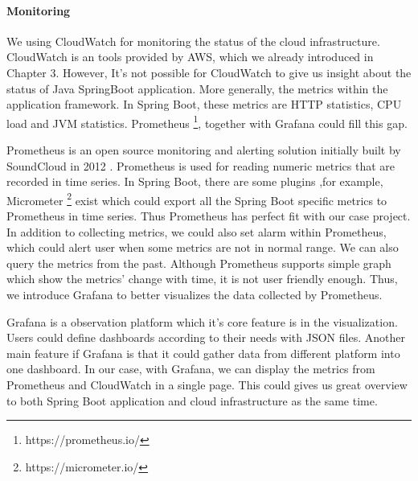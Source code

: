 \paragraph[]{Monitoring}
We using CloudWatch for monitoring the status of the cloud infrastructure. CloudWatch is an tools provided by AWS, which we already introduced in Chapter 3. However, It's not possible for CloudWatch to give us insight about the status of Java SpringBoot application. More generally, the metrics within the application framework. In Spring Boot, these metrics are HTTP statistics, CPU load and JVM statistics. Prometheus \footnote{https://prometheus.io/}, together with Grafana could fill this gap.
\par
Prometheus is an open source monitoring and alerting solution initially built by SoundCloud in 2012 \cite{Overview30:online}. Prometheus is used for reading numeric metrics that are recorded in time series. In Spring Boot, there are some plugins ,for example, Micrometer \footnote{https://micrometer.io/} exist which could export all the Spring Boot specific metrics to Prometheus in time series. Thus Prometheus has perfect fit with our case project. In addition to collecting metrics, we could also set alarm within Prometheus, which could alert user when some metrics are not in normal range. We can also query the metrics from the past. Although Prometheus supports simple graph which show the metrics' change with time, it is not user friendly enough. Thus, we introduce Grafana to better visualizes the data collected by Prometheus.
\par
Grafana is a observation platform which it's core feature is in the visualization. Users could define dashboards according to their needs with JSON files. Another main feature if Grafana is that it could gather data from different platform into one dashboard. In our case, with Grafana, we can display the metrics from Prometheus and CloudWatch in a single page. This could gives us great overview to both Spring Boot application and cloud infrastructure as the same time.

